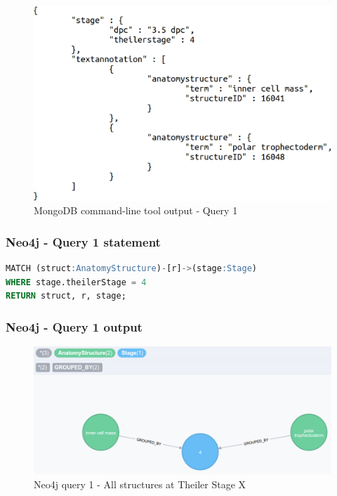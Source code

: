 \begin{figure}[H]\begin{center}\includegraphics[width=1\linewidth]{images/mongoquery1}\caption{MongoDB command-line tool output - Query 1}\label{fig:mongoquery1}\end{center}\end{figure}

\subsubsection*{Neo4j - Query 1 statement}\label{neoquery1statement}

\begin{lstlisting}[language=SQL, caption=Neo4j Query 1 statement. All structures at Theiler Stage 4, label=code:neoquery1]
MATCH (struct:AnatomyStructure)-[r]->(stage:Stage)
WHERE stage.theilerStage = 4
RETURN struct, r, stage;
\end{lstlisting}

\subsubsection*{Neo4j - Query 1 output}\label{neoquery1output}

\begin{figure}[H]\begin{center}\includegraphics[width=1\linewidth]{images/neo4jquery1graph}\caption{Neo4j query 1 - All structures at Theiler Stage X}\label{fig:neo4jquery1graph}\end{center}\end{figure}

